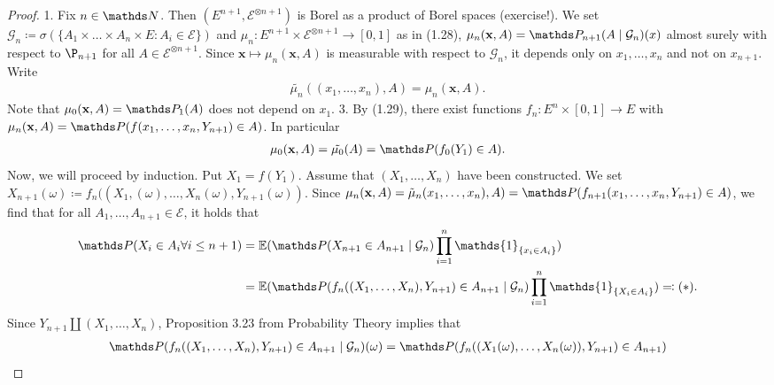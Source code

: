 \begin{proof}
1. Fix $n \in \N$.
Then $(E^{n+1},\mathcal{E}^{\otimes n+1})$ is Borel as a product of Borel spaces (exercise!).
We set $\mathcal{G}_n \coloneqq \sigma (\{A_1\times \dots \times A_n \times E  \colon A_i \in \mathcal{E}\})$ and $\mu_n \colon E^{n+1}\times \mathcal{E}^{\otimes n+1}\to  [0,1]$ as in (1.28),
\ie $\mu_n(\textbf{x},A)=\Prob_{n+1}(A \mid \mathcal{G}_n)(x)$ almost surely with respect to $\P_{n+1}$ for all $A \in \mathcal{E}^{\otimes n+1}$.
Since $\textbf{x} \mapsto \mu_n(\textbf{x},A)$ is measurable with respect to $\mathcal{G}_n$, it depends only on $x_1,\dots,x_n$ and not on $x_{n+1}$.
Write
\begin{align*}
\tilde{\mu_n}((x_1,\dots,x_n),A)=\mu_n(\textbf{x},A).
\end{align*}
Note that $\mu_0(\textbf{x},A)=\Prob_1(A)$ does not depend on $x_1$.
3. By (1.29), there exist functions $f_n \colon E^n \times [0,1]\to E$ with $\mu_n(\textbf{x},A)=\Prob(f(x_1,\dots,x_n,Y_{n+1})\in A)$.
In particular
\begin{align*}
\mu_0(\textbf{x},A)=\tilde{\mu_0}(A)=\Prob(f_0(Y_1)\in A).
\end{align*}
Now, we will proceed by induction.
Put $X_1=f(Y_1)$.
Assume that $(X_1,\dots,X_n)$ have been constructed.
We set $X_{n+1}(\omega)\coloneqq f_n((X_1,(\omega),\dots,X_n(\omega),Y_{n+1}(\omega))$.
Since $\mu_{n}(\textbf{x},A)=\tilde{\mu}_{n}(x_1,\dots,x_n),A)=\Prob(f_{n+1}(x_1,\dots,x_n,Y_{n+1})\in A)$,
we find that for all $A_1,\dots,A_{n+1}\in \mathcal{E}$, it holds that
\begin{align*}
\Prob(X_i \in A_i \forall i \leq n+1)&=\E{\Prob(X_{n+1}\in A_{n+1}\mid \mathcal{G}_n)\prod_{i=1}^n \mathds{1}_{\{x_i \in A_i\}}}\\
&=\E{\Prob(f_{n}((X_1,\dots,X_n),Y_{n+1})\in A_{n+1}\mid \mathcal{G}_n)\prod_{i=1}^n \mathds{1}_{\{X_i \in A_i\}}}\eqqcolon (\ast).
\end{align*}
Since $Y_{n+1} \amalg (X_1,\dots,X_n)$, Proposition 3.23 from Probability Theory implies that
\begin{align*}
\Prob(f_n((X_1,\dots,X_n),Y_{n+1})\in A_{n+1}\mid \mathcal{G}_n)(\omega)&=\Prob(f_n((X_1(\omega),\dots,X_n(\omega)),Y_{n+1})\in A_{n+1})\\

\end{align*}
\end{proof}
